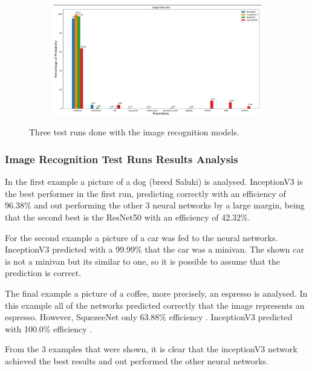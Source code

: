\begin{figure}[H]
\begin{subfigure}{0.25\textwidth}
      \end{subfigure}
      \begin{subfigure}{0.74\textwidth}
      \includegraphics[width=\textwidth]{Sections/4InitialWork/4_images/run4_res.png}
      \end{subfigure}
      
      \caption{Three test runs done with the image recognition models.}
      \end{figure}


\newpage

\subsubsection{Image Recognition Test Runs Results Analysis}


In the first example a picture of a dog (breed Saluki) is analysed. InceptionV3 is the best performer in the first run, predicting correctly with an efficiency of 96.38\% and out performing the other 3 neural networks by a large margin, being that the second best is the ResNet50 with an efficiency of 42.32\%.

For the second example a picture of a car was fed to the neural networks. InceptionV3 predicted with a 99.99\% that the car was a minivan. The shown car is not a minivan but its similar to one, so it is possible to assume that the prediction is correct.

The final example a picture of a coffee, more precisely, an espresso is analysed. In this example all of the networks predicted correctly that the image represents an espresso. However, SquezeeNet only 63.88\% efficiency . InceptionV3 predicted with 100.0\% efficiency .

From the 3 examples that were shown, it is clear that the inceptionV3 network achieved the best results and out performed the other neural networks.






